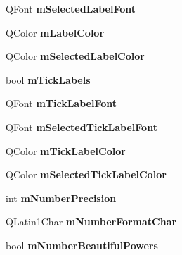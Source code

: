 \begin{DoxyCompactItemize}
\item 
Q\+Font {\bfseries m\+Selected\+Label\+Font}\hypertarget{classQCPAxis_ae48fe3489afadc0b3cd003233e2bf19f}{}\label{classQCPAxis_ae48fe3489afadc0b3cd003233e2bf19f}

\item 
Q\+Color {\bfseries m\+Label\+Color}\hypertarget{classQCPAxis_a457a003bb1c2b6ab73e5a173ba7558fd}{}\label{classQCPAxis_a457a003bb1c2b6ab73e5a173ba7558fd}

\item 
Q\+Color {\bfseries m\+Selected\+Label\+Color}\hypertarget{classQCPAxis_a94f57de3ba024471ca206d83cf2258dd}{}\label{classQCPAxis_a94f57de3ba024471ca206d83cf2258dd}

\item 
bool {\bfseries m\+Tick\+Labels}\hypertarget{classQCPAxis_a3e4315be072026644e69009557a2fa11}{}\label{classQCPAxis_a3e4315be072026644e69009557a2fa11}

\item 
Q\+Font {\bfseries m\+Tick\+Label\+Font}\hypertarget{classQCPAxis_add79d1e39c4ed65869a1e9cc79043f3f}{}\label{classQCPAxis_add79d1e39c4ed65869a1e9cc79043f3f}

\item 
Q\+Font {\bfseries m\+Selected\+Tick\+Label\+Font}\hypertarget{classQCPAxis_a4f2e4919da9615dac612662c249b1119}{}\label{classQCPAxis_a4f2e4919da9615dac612662c249b1119}

\item 
Q\+Color {\bfseries m\+Tick\+Label\+Color}\hypertarget{classQCPAxis_a6384a749b3b56a97df081d8082321ab4}{}\label{classQCPAxis_a6384a749b3b56a97df081d8082321ab4}

\item 
Q\+Color {\bfseries m\+Selected\+Tick\+Label\+Color}\hypertarget{classQCPAxis_a3bcad40902f45dc4c991a2c3e4d31d70}{}\label{classQCPAxis_a3bcad40902f45dc4c991a2c3e4d31d70}

\item 
int {\bfseries m\+Number\+Precision}\hypertarget{classQCPAxis_acd76e8c783384d99ccc4a13797eec188}{}\label{classQCPAxis_acd76e8c783384d99ccc4a13797eec188}

\item 
Q\+Latin1\+Char {\bfseries m\+Number\+Format\+Char}\hypertarget{classQCPAxis_a39594313deef458f425bba25cd337a8a}{}\label{classQCPAxis_a39594313deef458f425bba25cd337a8a}

\item 
bool {\bfseries m\+Number\+Beautiful\+Powers}\hypertarget{classQCPAxis_af03809bee3f3e35fcc38d25b6dd5003b}{}\label{classQCPAxis_af03809bee3f3e35fcc38d25b6dd5003b}


\end{DoxyCompactItemize}
